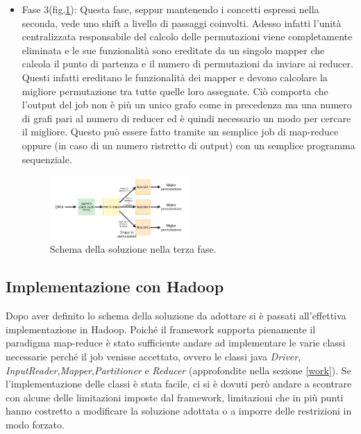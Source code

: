 \documentclass[]{IEEEtran}
\begin{document}
\begin{itemize}
	\item Fase 3(fig.\ref{sol_fase3}): Questa fase, seppur mantenendo i concetti espressi nella seconda, vede uno shift a livello di passaggi coinvolti. Adesso infatti l'unità centralizzata responsabile del calcolo delle permutazioni viene completamente eliminata e le sue funzionalità sono ereditate da un singolo mapper che calcola il punto di partenza e il numero di permutazioni da inviare ai reducer. Questi infatti ereditano le funzionalità dei mapper e devono calcolare la migliore permutazione tra tutte quelle loro assegnate. Ciò comporta che l'output del job non è più un unico grafo come in precedenza ma una numero di grafi pari al numero di reducer ed è quindi necessario un modo per cercare il migliore. Questo può essere fatto tramite un semplice job di map-reduce oppure (in caso di un numero ristretto di output) con un semplice programma sequenziale.
	\begin{figure}[htp]
		\includegraphics[width=0.5\textwidth]{images/sol_schema3.png}
		\caption{Schema della soluzione nella terza fase.}
		\label{sol_fase3}
	\end{figure}
\end{itemize}
\subsection{Implementazione con Hadoop}
Dopo aver definito lo schema della soluzione da adottare si è passati all'effettiva implementazione in Hadoop. Poiché il framework supporta pienamente il paradigma map-reduce è stato sufficiente andare ad implementare le varie classi necessarie perché il job venisse accettato, ovvero le classi java \emph{Driver}, \emph{InputReader},\emph{Mapper},\emph{Partitioner} e \emph{Reducer} (approfondite nella sezione \ref{work}). Se l'implementazione delle classi è stata facile, ci si è dovuti però andare a scontrare con alcune delle limitazioni imposte dal framework, limitazioni che in più punti hanno costretto a modificare la soluzione adottata o a imporre delle restrizioni in modo forzato.
\end{document}

